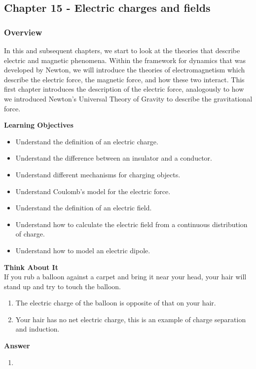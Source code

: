 \subsection{Chapter 15 - Electric charges and fields}

\subsubsection{Overview}\label{chapter:chargesfields}

In this and subsequent chapters, we start to look at the theories that describe electric and magnetic phenomena. Within the framework for dynamics that was developed by Newton, we will introduce the theories of electromagnetism which describe the electric force, the magnetic force, and how these two interact. This first chapter introduces the description of the electric force, analogously to how we introduced Newton's Universal Theory of Gravity to describe the gravitational force.

\begin{framed}
\textbf{Learning Objectives}\\
\begin{itemize}
\item Understand the definition of an electric charge.
\item Understand the difference between an insulator and a conductor.
\item Understand different mechanisms for charging objects.
\item Understand Coulomb's model for the electric force.
\item Understand the definition of an electric field.
\item Understand how to calculate the electric field from a continuous distribution of charge.
\item Understand how to model an electric dipole.
\end{itemize}
\end{framed}

\begin{framed}
\textbf{Think About It}\\
If you rub a balloon against a carpet and bring it near your head, your hair will stand up and try to touch the balloon.

\begin{enumerate}
\item The electric charge of the balloon is opposite of that on your hair.
\item Your hair has no net electric charge, this is an example of charge separation and induction.
\end{enumerate}

\begin{framed}
\textbf{Answer}\\
\begin{enumerate}[resume]
\item
\end{enumerate}
\end{framed}
\end{framed}

